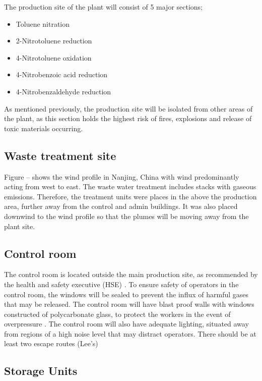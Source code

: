 The production site of the plant will consist of 5 major sections; 

\begin{itemize}
    \item Toluene nitration
    \item 2-Nitrotoluene reduction 
    \item 4-Nitrotoluene oxidation 
    \item 4-Nitrobenzoic acid reduction 
    \item 4-Nitrobenzaldehyde reduction 
\end{itemize}

As mentioned previously, the production site will be isolated from other areas of the plant, as this section holds the highest risk of fires, explosions  and release of toxic materials occurring. 

\subsection{Waste treatment site}

Figure -- shows the wind profile in Nanjing, China with wind predominantly acting from  west to east. The waste water treatment includes stacks with gaseous emissions. Therefore, the treatment units were places in the above the production area, further away from the control and admin buildings. It was also placed downwind to the wind profile so that the plumes will be moving away from the plant site. 

\subsection{Control room}

The control room is located outside the main production site, as recommended by the health and safety executive (HSE) \cite{health_and_safety_executive_control_nodate}. To ensure safety of operators in the control room, the windows will be sealed to prevent the influx of harmful gases that may be released. The control room will have blast proof walls with windows constructed of polycarbonate glass, to protect the workers in the event of overpressure \cite{health_and_safety_executive_control_nodate}. The control room will also have adequate lighting, situated away from regions of a high noise level that may distract operators. There should be at least two escape routes (Lee's)

\subsection{Storage Units}

